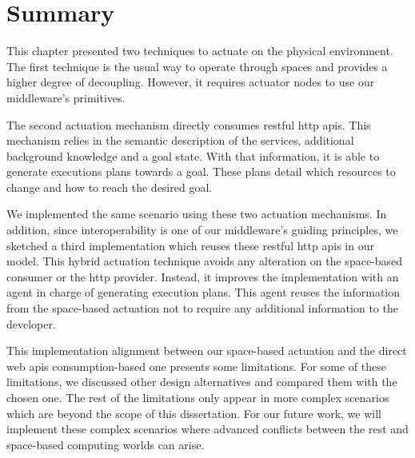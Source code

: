 \section{Summary}
\label{sec:actuation_summary}

This chapter presented two techniques to actuate on the physical environment.
The first technique is the usual way to operate through spaces and provides a higher degree of decoupling.
However, it requires actuator nodes to use our middleware's primitives. %


The second actuation mechanism directly consumes \ac{rest}ful \acs{http} \acsp{api}.
This mechanism relies in the semantic description of the services, additional background knowledge and a goal state. %
With that information, it is able to generate executions plans towards a goal.
These plans detail which resources to change and how to reach the desired goal.


We implemented the same scenario using these two actuation mechanisms.
In addition, since interoperability is one of our middleware's guiding principles, we sketched a third implementation which reuses these \ac{rest}ful \acs{http} \acsp{api} in our \Space{} model.
This hybrid actuation technique avoids any alteration on the space-based consumer or the \ac{http} provider.
Instead, it improves the \Space{} implementation with an agent in charge of generating execution plans.
This agent reuses the information from the space-based actuation not to require any additional information to the developer.


This implementation alignment between our space-based actuation and the direct web \acsp{api} consumption-based one presents some limitations.
For some of these limitations, we discussed other design alternatives and compared them with the chosen one.
The rest of the limitations only appear in more complex scenarios which are beyond the scope of this dissertation.
For our future work, we will implement these complex scenarios where advanced conflicts between the \ac{rest} and space-based computing worlds can arise.
